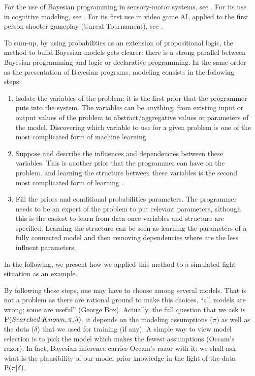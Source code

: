 For the use of Bayesian programming in sensory-motor systems, see \citep{PRDMSMS}. For its use in cognitive modeling, see \citep{Colas10}. For its first use in video game AI, applied to the first person shooter gameplay (Unreal Tournament), see \citep{LeHy04}.

To sum-up, by using probabilities as an extension of propositional logic, the method %
to build Bayesian models gets clearer: there is a strong parallel between Bayesian programming and logic or declarative programming. In the same order as the presentation of Bayesian programs, modeling consists in the following steps:
\begin{enumerate}
    \item Isolate the variables of the problem: it is the first prior that the programmer puts into the system. The variables can be anything, from existing input or output values of the problem to abstract/aggregative values or parameters of the model. Discovering which variable to use for a given problem is one of the most complicated form of machine learning.
    \item Suppose and describe the influences and dependencies between these variables. This is another prior that the programmer can have on the problem, and learning the structure between these variables is the second most complicated form of learning \citep{Fra04b,Ler05a}.
    \item Fill the priors and conditional probabilities parameters. The programmer needs to be an expert of the problem to put relevant parameters, although this is the easiest to learn from data once variables and structure are specified. Learning the structure can be seen as learning the parameters of a fully connected model and then removing dependencies where are the less influent parameters.%
\end{enumerate}
In the following, we present how we applied this method to a simulated  fight situation as an example.

By following these steps, one may have to choose among several models. That is not a problem as there are rational ground to make this choices, ``all models are wrong; some are useful'' (George Box). %
Actually, the full question that we ask is $\mathrm{P}(Searched|Known, \pi, \delta)$, it depends on the modeling assumptions ($\pi$) as well as the data ($\delta$) that we used for training (if any). A simple way to view model selection is to pick the model which makes the fewest assumptions (Occam's razor). In fact, Bayesian inference carries Occam's razor with it: we shall ask what is the plausibility of our model prior knowledge in the light of the data $\mathrm{P}(\pi|\delta)$. 

